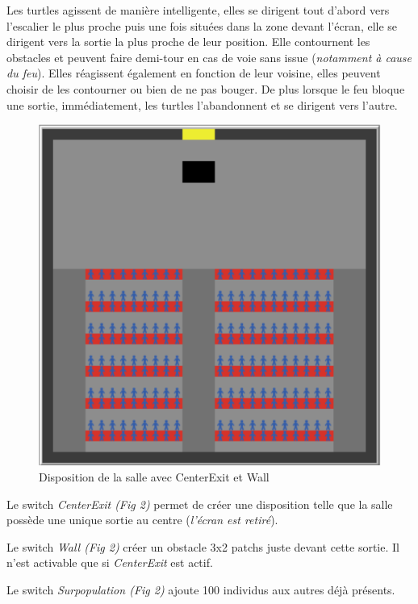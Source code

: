 \documentclass{article}
\begin{document}
Les turtles agissent de manière intelligente, elles se dirigent tout d'abord vers l'escalier le plus proche puis une fois situées dans la zone devant l'écran, elle se dirigent vers la sortie la plus proche de leur position. Elle contournent les obstacles et peuvent faire demi-tour en cas de voie sans issue ({\it notamment à cause du feu}). Elles réagissent également en fonction de leur voisine, elles peuvent choisir de les contourner ou bien de ne pas bouger. De plus lorsque le feu bloque une sortie, immédiatement, les turtles l'abandonnent et se dirigent vers l'autre. 

\begin{figure}[H]
	\includegraphics[scale=0.3]{center.PNG}
  \centering
	\caption{Disposition de la salle avec CenterExit et Wall}
 	\label{pic: Feu}
\end{figure}
Le switch {\it CenterExit (Fig 2)} permet de créer une disposition telle que la salle possède une unique sortie au centre ({\em l'écran est retiré}).

Le switch {\it Wall (Fig 2)} créer un obstacle 3x2 patchs juste devant cette sortie. Il n'est activable que si {\it CenterExit} est actif. 

Le switch {\it Surpopulation (Fig 2)} ajoute 100 individus aux autres déjà présents.
\end{document}
